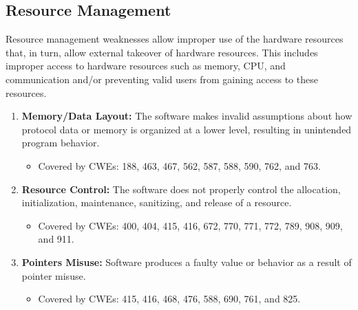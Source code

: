 \documentclass{article}
\begin{document}
\subsection{Resource Management}
Resource management weaknesses allow improper use of the hardware resources that, in turn, allow external takeover of hardware resources. This includes improper access to hardware resources such as memory, CPU, and communication and/or preventing valid users from gaining access to these resources.
\begin{enumerate}
    \item \textbf{Memory/Data Layout:} The software makes invalid assumptions about how protocol data or memory is organized at a lower level, resulting in unintended program behavior.
    \begin{itemize}
        \item Covered by CWEs: 188, 463, 467, 562, 587, 588, 590, 762, and 763.
    \end{itemize}
    
    \item \textbf{Resource Control:} The software does not properly control the allocation, initialization, maintenance, sanitizing, and release of a resource.
    \begin{itemize}
        \item Covered by CWEs: 400, 404, 415, 416, 672, 770, 771, 772, 789, 908, 909, and 911.
    \end{itemize}
    
    \item \textbf{Pointers Misuse:} Software produces a faulty value or behavior as a result of pointer misuse. 
    \begin{itemize}
        \item Covered by CWEs: 415, 416, 468, 476, 588, 690, 761, and 825. 
    \end{itemize}
\end{enumerate}    
\end{document}
